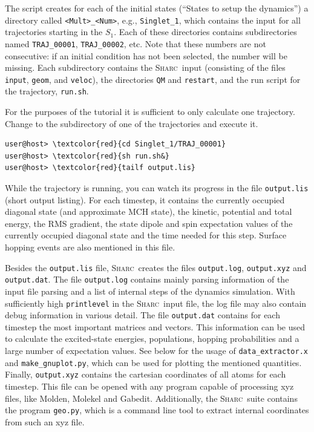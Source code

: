 \documentclass[a4paper,11pt,DIV=15,openany]{scrbook}
\newcommand{\sharc}{\textsc{Sharc}}
\newcommand{\ttt}[1]{\texttt{#1}}
\begin{document}
The script creates for each of the initial states (``States to setup the dynamics'') a directory called \ttt{<Mult>\_<Num>}, e.g., \ttt{Singlet\_1}, which contains the input for all trajectories starting in the $S_1$. 
Each of these directories contains subdirectories named \ttt{TRAJ\_00001}, \ttt{TRAJ\_00002}, etc. Note that these numbers are not consecutive: if an initial condition has not been selected, the number will be missing.
Each subdirectory contains the \sharc\ input (consisting of the files \ttt{input}, \ttt{geom}, and \ttt{veloc}), the directories \ttt{QM} and \ttt{restart}, and the run script for the trajectory, \ttt{run.sh}.

For the purposes of the tutorial it is sufficient to only calculate one trajectory. Change to the subdirectory of one of the trajectories and execute it.
\begin{Verbatim}[commandchars=\\\{\}]
user@host> \textcolor{red}{cd Singlet_1/TRAJ_00001}
user@host> \textcolor{red}{sh run.sh&}
user@host> \textcolor{red}{tailf output.lis}
\end{Verbatim}
While the trajectory is running, you can watch its progress in the file \ttt{output.lis} (short output listing). For each timestep, it contains the currently occupied diagonal state (and approximate MCH state), the kinetic, potential and total energy, the RMS gradient, the state dipole and spin expectation values of the currently occupied diagonal state and the time needed for this step. Surface hopping events are also mentioned in this file.

Besides the \ttt{output.lis} file, \sharc\ creates the files \ttt{output.log}, \ttt{output.xyz} and \ttt{output.dat}. The file
\ttt{output.log} contains mainly parsing information of the input file parsing and a list of internal steps of the dynamics simulation. With sufficiently high \ttt{printlevel} in the \sharc\ input file, the log file may also contain debug information in various detail.
The file \ttt{output.dat} contains for each timestep the most important matrices and vectors. This information can be used to calculate the excited-state energies, populations, hopping probabilities and a large number of expectation values. See below for the usage of \ttt{data\_extractor.x} and \ttt{make\_gnuplot.py}, which can be used for plotting the mentioned quantities.
Finally, \ttt{output.xyz} contains the cartesian coordinates of all atoms for each timestep. This file can be opened with any program capable of processing xyz files, like Molden, Molekel and Gabedit. Additionally, the \sharc\ suite contains the program \ttt{geo.py}, which is a command line tool to extract internal coordinates from such an xyz file.
\end{document}
